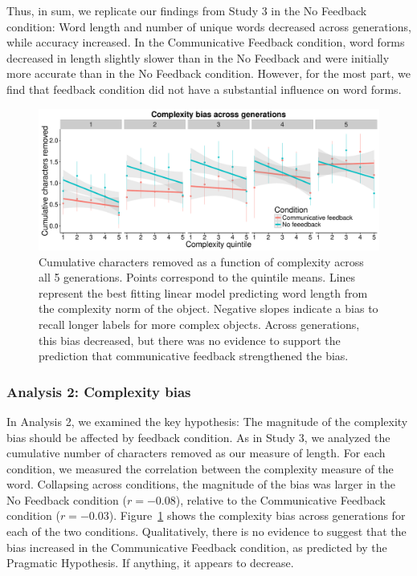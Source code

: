 Thus, in sum, we replicate our findings from Study 3 in the No Feedback condition: Word length and number of unique words decreased across generations, while accuracy increased. In the Communicative Feedback condition, word forms decreased in length slightly slower than in the No Feedback and were initially more accurate than in the No Feedback condition. However, for the most part, we find that feedback condition did not have a substantial influence on word forms.

\begin{figure}[t!]
\begin{center}
\includegraphics[scale = .5]{figs/chap4_4bias.pdf}
\end{center}
\caption{Cumulative characters removed as a function of complexity across all 5 generations. Points correspond to the quintile means. Lines represent the best fitting linear model predicting word length from the complexity norm of the object. Negative slopes indicate a bias to recall longer labels for  more complex objects. Across generations, this bias decreased, but there was no evidence to support the prediction that communicative feedback strengthened the bias.}
\label{fig:cbias4}
\end{figure}


\subsubsection{Analysis 2: Complexity bias}
In Analysis 2, we examined the key hypothesis: The magnitude of the complexity bias should be affected by feedback condition. As in Study 3, we analyzed the cumulative number of characters removed as our measure of length. For each condition, we measured the correlation between the complexity measure of the word. Collapsing across conditions, the magnitude of the bias was larger in the No Feedback condition ($r = -0.08$), relative to the Communicative Feedback condition  ($r = -0.03$).  Figure\ \ref{fig:cbias4} shows the complexity bias across generations for each of the two conditions. Qualitatively, there is no evidence to suggest that the bias increased in the Communicative Feedback condition, as predicted by the Pragmatic Hypothesis. If anything, it appears to decrease. 

